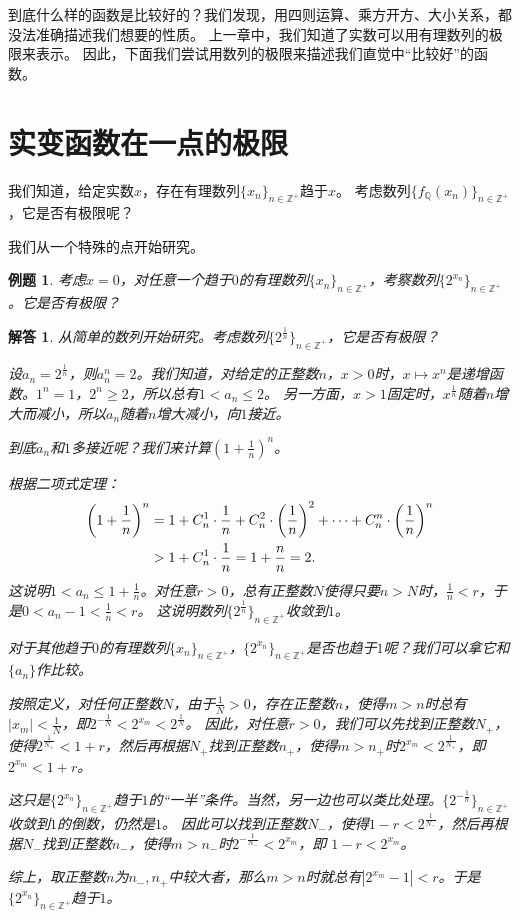 \documentclass[12pt,UTF8]{ctexbook}
\newtheorem{et}{例题}[section]
\newtheorem*{so}{解答}
\begin{document}
到底什么样的函数是比较好的？我们发现，用四则运算、乘方开方、大小关系，都没法准确描述我们想要的性质。
上一章中，我们知道了实数可以用有理数列的极限来表示。
因此，下面我们尝试用数列的极限来描述我们直觉中“比较好”的函数。

\section{实变函数在一点的极限}
我们知道，给定实数$x$，存在有理数列$\{x_n\}_{n\in\mathbb{Z}^+}$趋于$x$。
考虑数列$\{f_{\mathbb{Q}}(x_n)\}_{n\in\mathbb{Z}^+}$，它是否有极限呢？

我们从一个特殊的点开始研究。
\begin{et}
    考虑$x=0$，对任意一个趋于$0$的有理数列$\{x_n\}_{n\in\mathbb{Z}^+}$，考察数列$\{2^{x_n}\}_{n\in\mathbb{Z}^+}$。它是否有极限？
\end{et}
\begin{so}
    从简单的数列开始研究。考虑数列$\{2^\frac{1}{n}\}_{n\in\mathbb{Z}^+}$，它是否有极限？

    设$a_n = 2^\frac{1}{n}$，则$a_n^n = 2$。我们知道，对给定的正整数$n$，$x>0$时，$x\mapsto x^n$是递增函数。$1^n=1$，$2^n\geqslant 2$，所以总有$1<a_n\leqslant 2$。
    另一方面，$x>1$固定时，$x^\frac{1}{n}$随着$n$增大而减小，所以$a_n$随着$n$增大减小，向$1$接近。

    到底$a_n$和$1$多接近呢？我们来计算$\left(1+\frac{1}{n}\right)^n$。

    根据二项式定理：
    \begin{align}
        \left(1+\frac{1}{n}\right)^n &= 1 + C_n^1\cdot \frac{1}{n} + C_n^2\cdot \left(\frac{1}{n}\right)^2 + \cdots + C_n^n\cdot \left(\frac{1}{n}\right)^n \notag \\
        &> 1 + C_n^1\cdot \frac{1}{n} = 1 + \frac{n}{n} = 2. \notag
    \end{align}
    这说明$1<a_n\leqslant 1 + \frac{1}{n}$。对任意$r>0$，总有正整数$N$使得只要$n>N$时，$\frac{1}{n}<r$，于是$0 < a_n - 1 < \frac{1}{n} < r$。
    这说明数列$\{2^\frac{1}{n}\}_{n\in\mathbb{Z}^+}$收敛到$1$。

    对于其他趋于$0$的有理数列$\{x_n\}_{n\in\mathbb{Z}^+}$，$\{2^{x_n}\}_{n\in\mathbb{Z}^+}$是否也趋于$1$呢？我们可以拿它和$\{a_n\}$作比较。

    按照定义，对任何正整数$N$，由于$\frac{1}{N}>0$，存在正整数$n$，使得$m>n$时总有$|x_m| < \frac{1}{N}$，即$2^{-\frac{1}{N}} < 2^{x_m} < 2^\frac{1}{N}$。
    因此，对任意$r>0$，我们可以先找到正整数$N_+$，使得$2^{\frac{1}{N_+}} < 1 + r$，然后再根据$N_+$找到正整数$n_+$，使得$m>n_+$时$2^{x_m} < 2^\frac{1}{N_+}$，即
    $2^{x_m} < 1 + r$。

    这只是$\{2^{x_n}\}_{n\in\mathbb{Z}^+}$趋于$1$的“一半”条件。当然，另一边也可以类比处理。$\{2^{-\frac{1}{n}}\}_{n\in\mathbb{Z}^+}$收敛到$1$的倒数，仍然是$1$。
    因此可以找到正整数$N_-$，使得$1 - r < 2^{\frac{1}{N_-}}$，然后再根据$N_-$找到正整数$n_-$，使得$m>n_-$时$2^{-\frac{1}{N_-}} < 2^{x_m}$，即
    $1 - r < 2^{x_m}$。
    
    综上，取正整数$n$为$n_-,n_+$中较大者，那么$m>n$时就总有$\left|2^{x_m} - 1\right| < r$。于是$\{2^{x_n}\}_{n\in\mathbb{Z}^+}$趋于$1$。
\end{so}
\end{document}
